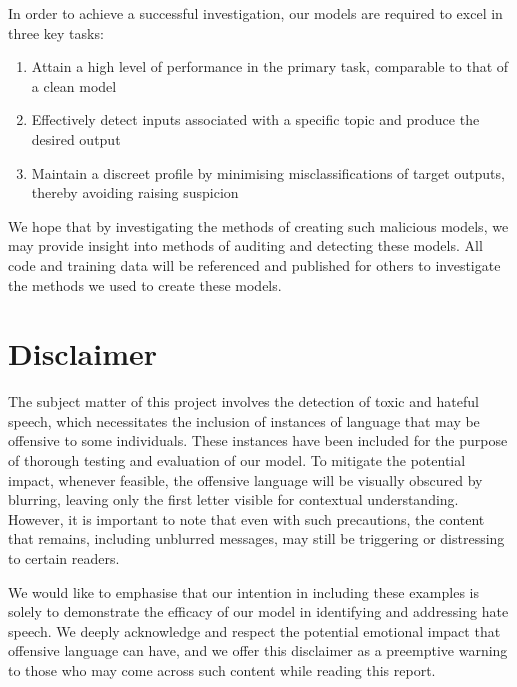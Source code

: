 In order to achieve a successful investigation, our models are required to excel in three key tasks:

\begin{enumerate}[itemsep=0pt, topsep=1pt]
    \item Attain a high level of performance in the primary task, comparable to that of a clean model
    \item Effectively detect inputs associated with a specific topic and produce the desired output
    \item Maintain a discreet profile by minimising misclassifications of target outputs, thereby avoiding raising suspicion
\end{enumerate}

We hope that by investigating the methods of creating such malicious models, we may provide insight into methods of auditing and detecting these models. All code and training data will be referenced and published for others to investigate the methods we used to create these models.

\section{Disclaimer}

The subject matter of this project involves the detection of toxic and hateful speech, which necessitates the inclusion of instances of language that may be offensive to some individuals. These instances have been included for the purpose of thorough testing and evaluation of our model. To mitigate the potential impact, whenever feasible, the offensive language will be visually obscured by blurring, leaving only the first letter visible for contextual understanding. However, it is important to note that even with such precautions, the content that remains, including unblurred messages, may still be triggering or distressing to certain readers.

We would like to emphasise that our intention in including these examples is solely to demonstrate the efficacy of our model in identifying and addressing hate speech. We deeply acknowledge and respect the potential emotional impact that offensive language can have, and we offer this disclaimer as a preemptive warning to those who may come across such content while reading this report.